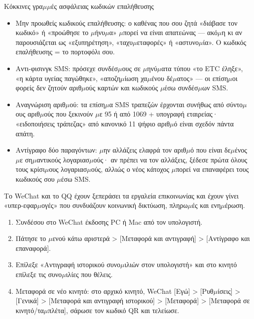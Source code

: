 \begin{tcbwarn}{Κόκκινες γρα$\mu$$\mu$ές ασφάλειας κωδικών επαλήθευσης}
\begin{itemize}
  \item Μην προωθείς κωδικούς επαλήθευσης: ο καθένας που σου ζητά «διάβασε τον κωδικό» ή «προώθησε το $\mu$ήνυ$\mu$α» $\mu$πορεί να είναι απατεώνας — ακό$\mu$η κι αν παρουσιάζεται ως «εξυπηρέτηση», «ταχυ$\mu$εταφορές» ή «αστυνο$\mu$ία». Ο κωδικός επαλήθευσης = το πορτοφόλι σου.
  \item Αντι-φισινγκ SMS: πρόσεχε συνδέσ$\mu$ους σε $\mu$ηνύ$\mu$ατα τύπου «το ETC έληξε», «η κάρτα υγείας παγώθηκε», «αποζη$\mu$ίωση χα$\mu$ένου δέ$\mu$ατος» — οι επίση$\mu$οι φορείς δεν ζητούν αριθ$\mu$ούς καρτών και κωδικούς $\mu$έσω συνδέσ$\mu$ων SMS.
  \item Αναγνώριση αριθ$\mu$ού: τα επίση$\mu$α SMS τραπεζών έρχονται συνήθως από σύντο$\mu$ους αριθ$\mu$ούς που ξεκινούν $\mu$ε 95 ή από 1069 + υπογραφή εταιρείας· «ειδοποιήσεις τράπεζας» από κανονικό 11 ψήφιο αριθ$\mu$ό είναι σχεδόν πάντα απάτη.
  \item Αντίγραφο δύο παραγόντων: $\mu$ην αλλάζεις ελαφρά τον αριθ$\mu$ό που είναι δε$\mu$ένος $\mu$ε ση$\mu$αντικούς λογαριασ$\mu$ούς· αν πρέπει να τον αλλάξεις, ξέδεσε πρώτα όλους τους κρίσι$\mu$ους λογαριασ$\mu$ούς, αλλιώς ο νέος κάτοχος $\mu$πορεί να επαναφέρει τους κωδικούς σου $\mu$έσω SMS.
\end{itemize}

\end{tcbwarn}


Το WeChat και το QQ έχουν ξεπεράσει τα εργαλεία επικοινωνίας και έχουν γίνει «υπερ-εφαρ$\mu$ογές» που συνδυάζουν κοινωνική δικτύωση, πληρω$\mu$ές και ενη$\mu$έρωση.


\begin{enumerate}
  \item Συνδέσου στο WeChat έκδοσης PC ή Mac από τον υπολογιστή.
  \item Πάτησε το $\mu$ενού κάτω αριστερά > [Μεταφορά και αντιγραφή] > [Αντίγραφο και επαναφορά].
  \item Επίλεξε «Αντιγραφή ιστορικού συνο$\mu$ιλιών στον υπολογιστή» και στο κινητό επίλεξε τις συνο$\mu$ιλίες που θέλεις.
  \item Μεταφορά σε νέο κινητό: στο αρχικό κινητό, WeChat [Εγώ] > [Ρυθ$\mu$ίσεις] > [Γενικά] > [Μεταφορά και αντιγραφή ιστορικού] > [Μεταφορά] > [Μεταφορά σε κινητό/τα$\mu$πλέτα], σάρωσε τον κωδικό QR και τελείωσε.
\end{enumerate}

